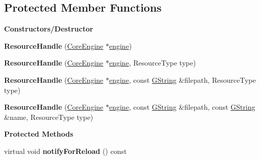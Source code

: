 \subsection*{Protected Member Functions}
\begin{Indent}\textbf{ Constructors/\+Destructor}\par
\begin{DoxyCompactItemize}
\item 
\mbox{\label{classrev_1_1_resource_handle_a02cb71c966aeb0bcffae8057ec0791f0}} 
{\bfseries Resource\+Handle} (\mbox{\hyperlink{classrev_1_1_core_engine}{Core\+Engine}} $\ast$\mbox{\hyperlink{classrev_1_1_resource_handle_a720422f2150ec9eec2b3984953a13ef8}{engine}})
\item 
\mbox{\label{classrev_1_1_resource_handle_a9c114d4fde3a57ab3bb8790a4c4f9b68}} 
{\bfseries Resource\+Handle} (\mbox{\hyperlink{classrev_1_1_core_engine}{Core\+Engine}} $\ast$\mbox{\hyperlink{classrev_1_1_resource_handle_a720422f2150ec9eec2b3984953a13ef8}{engine}}, Resource\+Type type)
\item 
\mbox{\label{classrev_1_1_resource_handle_a800c99bd5ead043480f05de189c1e4bd}} 
{\bfseries Resource\+Handle} (\mbox{\hyperlink{classrev_1_1_core_engine}{Core\+Engine}} $\ast$\mbox{\hyperlink{classrev_1_1_resource_handle_a720422f2150ec9eec2b3984953a13ef8}{engine}}, const \mbox{\hyperlink{classrev_1_1_g_string}{G\+String}} \&filepath, Resource\+Type type)
\item 
\mbox{\label{classrev_1_1_resource_handle_afe8e880dcdadaa48e5d2376d7488f43e}} 
{\bfseries Resource\+Handle} (\mbox{\hyperlink{classrev_1_1_core_engine}{Core\+Engine}} $\ast$\mbox{\hyperlink{classrev_1_1_resource_handle_a720422f2150ec9eec2b3984953a13ef8}{engine}}, const \mbox{\hyperlink{classrev_1_1_g_string}{G\+String}} \&filepath, const \mbox{\hyperlink{classrev_1_1_g_string}{G\+String}} \&name, Resource\+Type type)
\end{DoxyCompactItemize}
\end{Indent}
\begin{Indent}\textbf{ Protected Methods}\par
\begin{DoxyCompactItemize}
\item 
\mbox{\label{classrev_1_1_resource_handle_a543eb39bdcd57caa143a216812cbfca4}} 
virtual void {\bfseries notify\+For\+Reload} () const
\end{DoxyCompactItemize}
\end{Indent}
